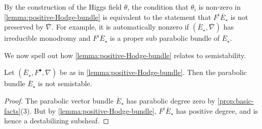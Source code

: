\begin{remark}
\notready
    By the construction of the Higgs field $\theta$, the condition that
    $\theta_i$ is non-zero in \autoref{lemma:positive-Hodge-bundle} is
    equivalent to the statement that $F^i\overline{E}_\star$ is not preserved by
    $\overline{\nabla}$. For example, it is automatically nonzero if
    $(\overline{E}_\star, \overline{\nabla})$ has irreducible monodromy and
    $F^i\overline{E}_\star$ is a proper sub parabolic bundle of
    $\overline{E}_\star$.
\end{remark}

We now spell out how \autoref{lemma:positive-Hodge-bundle}
relates to semistability.
\begin{corollary}
\notready\label{corollary:unstable}
Let $(\overline{E}_\star, F^\bullet, \nabla)$ be as in
\autoref{lemma:positive-Hodge-bundle}. Then the parabolic bundle
$\overline{E}_\star$ is not semistable.
\end{corollary}
\begin{proof}
    The parabolic vector bundle $\overline{E}_\star$ has parabolic degree zero
    by \autoref{prop:basic-facts}(3). But by
    \autoref{lemma:positive-Hodge-bundle}, $F^i\overline{E}_\star$ has positive degree, and is hence a destabilizing subsheaf.
\end{proof}
